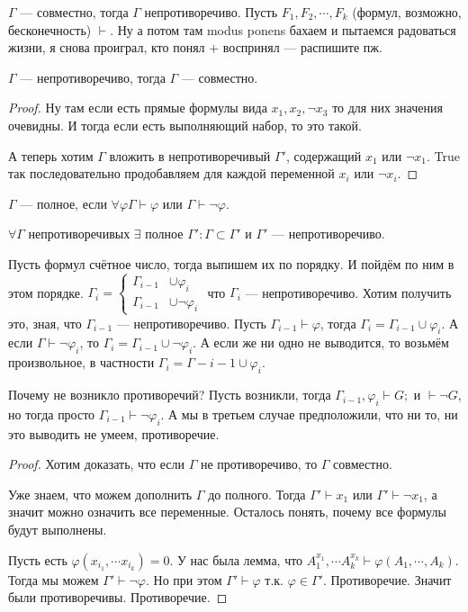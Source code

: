 \begin{statement}
	$\Gamma$ --- совместно, тогда $\Gamma$ непротиворечиво. Пусть $F_1, F_2, \cdots, F_k$ (формул, возможно, бесконечность) $\vdash$. Ну а потом там modus ponens бахаем и пытаемся радоваться жизни, я снова проиграл, кто понял + воспринял --- распишите пж.
\end{statement}
\begin{statement}
	$\Gamma$ --- непротиворечиво, тогда $\Gamma$ --- совместно. 
\end{statement}
\begin{proof}
	Ну там если есть прямые формулы вида $x_1, x_2, \lnot x_3$ то для них значения очевидны. И тогда если есть выполняющий набор, то это такой.

	А теперь хотим $\Gamma$ вложить в непротиворечивый $\Gamma'$, содержащий $x_1$ или $\lnot x_1$. True так последовательно продобавляем для каждой переменной $x_i$ или $\lnot x_i$. 
\end{proof}
\begin{definition}
	$\Gamma$ --- полное, если $\forall \varphi \Gamma \vdash \varphi$ или $\Gamma \vdash \lnot \varphi$.
\end{definition}
\begin{statement}
	$\forall \Gamma $ непротиворечивых $\exists$ полное $\Gamma': \Gamma \subset \Gamma'$ и $\Gamma'$ --- непротиворечиво.

	Пусть формул счётное число, тогда выпишем их по порядку. И пойдём по ним в этом порядке. $\Gamma_{i} = \left\{ \begin{aligned} \Gamma_{i-1} &\cup \varphi_i \\ \Gamma_{i-1} &\cup \lnot \varphi_i \end{aligned} \right.$ что $\Gamma_{i}$ --- непротиворечиво. Хотим получить это, зная, что $\Gamma_{i-1}$ --- непротиворечиво. Пусть $\Gamma_{i-1} \vdash \varphi$, тогда $\Gamma_i = \Gamma_{i-1} \cup \varphi_i$. А если $\Gamma \vdash \lnot \varphi_i$, то $\Gamma_i = \Gamma_{i-1} \cup \lnot \varphi_i$. А если же ни одно не выводится, то возьмём произвольное, в частности $\Gamma_i = \Gamma-{i-1} \cup \varphi_i$. 

	Почему не возникло противоречий? Пусть возникли, тогда $\Gamma_{i-1}, \varphi_i \vdash G; \text{ и } \vdash \lnot G$, но тогда просто $\Gamma_{i-1} \vdash \lnot \varphi_i$. А мы в третьем случае предположили, что ни то, ни это выводить не умеем, противоречие. 
\end{statement}

\begin{proof}
	Хотим доказать, что если $\Gamma$ не противоречиво, то $\Gamma$ совместно.

	Уже знаем, что можем дополнить $\Gamma$ до полного. Тогда $\Gamma' \vdash x_1$ или $\Gamma' \vdash \lnot x_1$, а значит можно означить все переменные. Осталось понять, почему все формулы будут выполнены.

	Пусть есть $\varphi(x_{i_1}, \cdots x_{i_k}) = 0$. У нас была лемма, что $A_1^{x_1}, \cdots A_k^{x_k} \vdash \varphi(A_1, \cdots,  A_k)$. Тогда мы можем $\Gamma' \vdash \lnot \varphi$. Но при этом $\Gamma' \vdash \varphi$ т.к. $\varphi \in \Gamma'$. Противоречие. Значит были противоречивы. Противоречие.
\end{proof}

